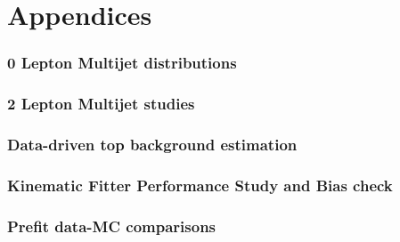 \documentclass[UKenglish,texlive=2013]{\ATLASLATEXPATH atlasdoc}
\begin{document}
\clearpage
\newpage
\appendix
\part*{Appendices}


\clearpage
\section{0 Lepton Multijet distributions}
\label{app:0lepQCDDistributions}


\clearpage
\section{2 Lepton Multijet studies}
\label{app:2lepMJstudy}


\clearpage
\section{Data-driven top background estimation}
\label{app:topDD}


\clearpage
\section{Kinematic Fitter Performance Study and Bias check}
\label{app:KF}


\clearpage
\section{Prefit data-MC comparisons}
\label{app:prefitplots}


\clearpage

%
\end{document}
